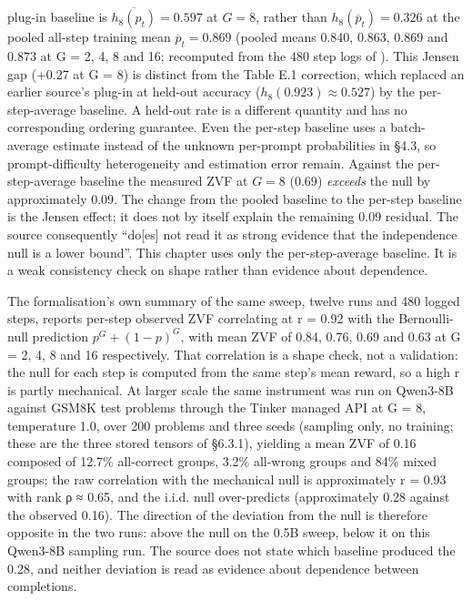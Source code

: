 \documentclass[12pt,a4paper]{report}
\DeclareRobustCommand{\longtok}[1]{\texttt{\seqsplit{#1}}}
\begin{document}
plug-in baseline is \(\overline{h_8(p_t)} = 0.597\) at \(G = 8\), rather
than \(h_8(\overline p_t) = 0.326\) at the pooled all-step training mean
\(\overline p_t = 0.869\) (pooled means 0.840, 0.863, 0.869 and 0.873 at
G = 2, 4, 8 and 16; recomputed from the 480 step logs of
\longtok{groupsize\_\allowbreak{}zvf\_\allowbreak{}sweep.json}). This Jensen gap (+0.27 at G = 8)
is distinct from the Table E.1 correction, which replaced an earlier
source's plug-in at held-out accuracy (\(h_8(0.923) \approx 0.527\)) by
the per-step-average baseline. A held-out rate is a different quantity
and has no corresponding ordering guarantee. Even the per-step baseline
uses a batch-average estimate instead of the unknown per-prompt
probabilities in §4.3, so prompt-difficulty heterogeneity and estimation
error remain. Against the per-step-average baseline the measured ZVF at
\(G = 8\) (\(0.69\)) \emph{exceeds} the null by approximately \(0.09\).
The change from the pooled baseline to the per-step baseline is the
Jensen effect; it does not by itself explain the remaining 0.09
residual. The source consequently ``do{[}es{]} not read it as strong
evidence that the independence null is a lower bound''. This chapter
uses only the per-step-average baseline. It is a weak consistency check
on shape rather than evidence about dependence.

The formalisation's own summary of the same sweep, twelve runs and 480
logged steps, reports per-step observed ZVF correlating at r = 0.92 with
the Bernoulli-null prediction \(p^G + (1-p)^G\), with mean ZVF of 0.84,
0.76, 0.69 and 0.63 at G = 2, 4, 8 and 16 respectively. That correlation
is a shape check, not a validation: the null for each step is computed
from the same step's mean reward, so a high r is partly mechanical. At
larger scale the same instrument was run on Qwen3-8B against GSM8K test
problems through the Tinker managed API at G = 8, temperature 1.0, over
200 problems and three seeds (sampling only, no training; these are the
three stored tensors of §6.3.1), yielding a mean ZVF of 0.16 composed of
12.7\% all-correct groups, 3.2\% all-wrong groups and 84\% mixed groups;
the raw correlation with the mechanical null is approximately r = 0.93
with rank ρ ≈ 0.65, and the i.i.d. null over-predicts (approximately
0.28 against the observed 0.16). The direction of the deviation from the
null is therefore opposite in the two runs: above the null on the 0.5B
sweep, below it on this Qwen3-8B sampling run. The source does not state
which baseline produced the 0.28, and neither deviation is read as
evidence about dependence between completions.
\end{document}
